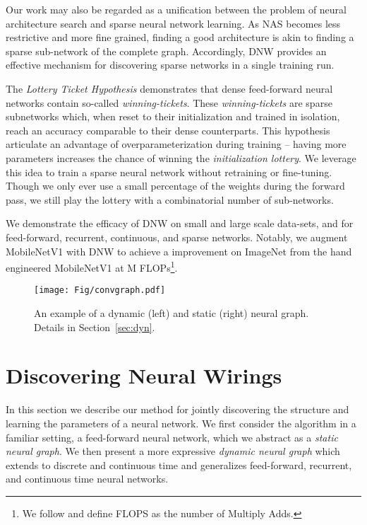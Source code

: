 \documentclass{article}
\begin{document}
Our work may also be regarded as a unification between the problem of neural architecture search and sparse neural network learning. As NAS becomes less restrictive and more fine grained, finding a good architecture is akin to finding a sparse sub-network of the complete graph. Accordingly, DNW provides an effective mechanism for discovering sparse networks in a single training run.


The \textit{Lottery Ticket Hypothesis} \cite{lth,lth2} demonstrates that dense feed-forward neural networks contain so-called \textit{winning-tickets}. These \textit{winning-tickets} are sparse subnetworks which, when reset to their initialization and trained in isolation, reach an accuracy comparable to their dense counterparts. This hypothesis articulate an advantage of overparameterization during training -- having more parameters increases the chance of winning the \textit{initialization lottery}. We leverage this idea to train a sparse neural network without retraining or fine-tuning. Though we only ever use a small percentage of the weights during the forward pass, we still play the lottery with a combinatorial number of sub-networks.


We demonstrate the efficacy of DNW on small and large scale data-sets, and for feed-forward, recurrent, continuous, and sparse networks. Notably, we augment MobileNetV1 \cite{mobilenetv1} with DNW to achieve a  improvement on ImageNet \cite{imagenet} from the hand engineered MobileNetV1 at M FLOPs\footnote{We follow \cite{shufflenet, shufflenetv2} and define FLOPS as the number of Multiply Adds.}.

\begin{figure*}
    \centering
    \texttt{[image: Fig/convgraph.pdf]}
    \caption{An example of a dynamic (left) and static (right) neural graph. Details in Section~\ref{sec:dyn}.}
    \label{fig:convgraph}
\end{figure*}
\section{Discovering Neural Wirings}

In this section we describe our method for jointly discovering the structure and learning the parameters of a neural network. We first consider the algorithm in a familiar setting, a feed-forward neural network, which we abstract as a \textit{static neural graph}. We then present a more expressive \textit{dynamic neural graph} which extends to discrete and continuous time and generalizes feed-forward, recurrent, and continuous time neural networks.
\end{document}
